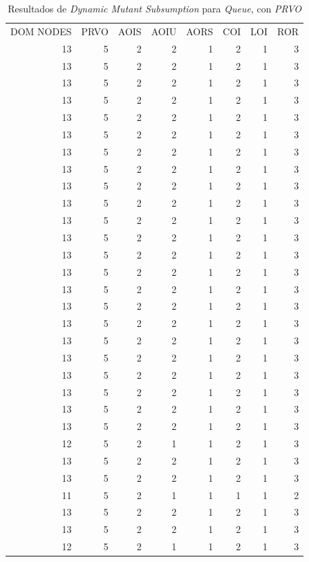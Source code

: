 \begin{table}[]
	\caption[\emph{Dynamic Mutant Subsumption} \emph{Queue}, con \emph{PRVO}]{Resultados de \emph{Dynamic Mutant Subsumption} para \emph{Queue}, con \emph{PRVO}}
	\label{tables.results.subsumption.queue.prvo}
	\centering
	\scriptsize
	\def\arraystretch{0.95}
	\setlength\tabcolsep{0.5mm}
	\begin{tabular}{rrrrrrrr}
		DOM NODES & PRVO & AOIS & AOIU & AORS & COI & LOI & ROR \\
		13 & 5 & 2 & 2 & 1 & 2 & 1 & 3 \\
		13 & 5 & 2 & 2 & 1 & 2 & 1 & 3 \\
		13 & 5 & 2 & 2 & 1 & 2 & 1 & 3 \\
		13 & 5 & 2 & 2 & 1 & 2 & 1 & 3 \\
		13 & 5 & 2 & 2 & 1 & 2 & 1 & 3 \\
		13 & 5 & 2 & 2 & 1 & 2 & 1 & 3 \\
		13 & 5 & 2 & 2 & 1 & 2 & 1 & 3 \\
		13 & 5 & 2 & 2 & 1 & 2 & 1 & 3 \\
		13 & 5 & 2 & 2 & 1 & 2 & 1 & 3 \\
		13 & 5 & 2 & 2 & 1 & 2 & 1 & 3 \\
		13 & 5 & 2 & 2 & 1 & 2 & 1 & 3 \\
		13 & 5 & 2 & 2 & 1 & 2 & 1 & 3 \\
		13 & 5 & 2 & 2 & 1 & 2 & 1 & 3 \\
		13 & 5 & 2 & 2 & 1 & 2 & 1 & 3 \\
		13 & 5 & 2 & 2 & 1 & 2 & 1 & 3 \\
		13 & 5 & 2 & 2 & 1 & 2 & 1 & 3 \\
		13 & 5 & 2 & 2 & 1 & 2 & 1 & 3 \\
		13 & 5 & 2 & 2 & 1 & 2 & 1 & 3 \\
		13 & 5 & 2 & 2 & 1 & 2 & 1 & 3 \\
		13 & 5 & 2 & 2 & 1 & 2 & 1 & 3 \\
		13 & 5 & 2 & 2 & 1 & 2 & 1 & 3 \\
		13 & 5 & 2 & 2 & 1 & 2 & 1 & 3 \\
		13 & 5 & 2 & 2 & 1 & 2 & 1 & 3 \\
		12 & 5 & 2 & 1 & 1 & 2 & 1 & 3 \\
		13 & 5 & 2 & 2 & 1 & 2 & 1 & 3 \\
		13 & 5 & 2 & 2 & 1 & 2 & 1 & 3 \\
		11 & 5 & 2 & 1 & 1 & 1 & 1 & 2 \\
		13 & 5 & 2 & 2 & 1 & 2 & 1 & 3 \\
		13 & 5 & 2 & 2 & 1 & 2 & 1 & 3 \\
		12 & 5 & 2 & 1 & 1 & 2 & 1 & 3
	\end{tabular}
\end{table}

